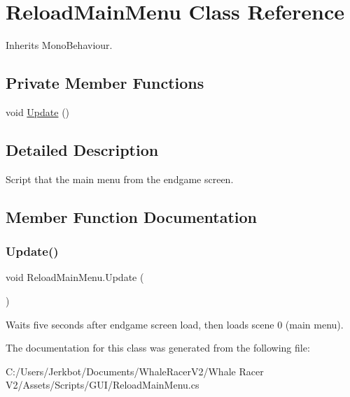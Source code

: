\hypertarget{class_reload_main_menu}{}\section{Reload\+Main\+Menu Class Reference}
\label{class_reload_main_menu}


Inherits Mono\+Behaviour.

\subsection*{Private Member Functions}
\begin{DoxyCompactItemize}
\item 
void \hyperlink{class_reload_main_menu_a57cffc9071822e96d43d4b48270a8583}{Update} ()
\end{DoxyCompactItemize}


\subsection{Detailed Description}
Script that the main menu from the endgame screen. 



\subsection{Member Function Documentation}
\mbox{\label{class_reload_main_menu_a57cffc9071822e96d43d4b48270a8583}} 
\subsubsection{\texorpdfstring{Update()}{Update()}}
{\footnotesize\ttfamily void Reload\+Main\+Menu.\+Update (\begin{DoxyParamCaption}{ }\end{DoxyParamCaption})\hspace{0.3cm}{\ttfamily [private]}}



Waits five seconds after endgame screen load, then loads scene 0 (main menu). 



The documentation for this class was generated from the following file\+:\begin{DoxyCompactItemize}
\item 
C\+:/\+Users/\+Jerkbot/\+Documents/\+Whale\+Racer\+V2/\+Whale Racer V2/\+Assets/\+Scripts/\+G\+U\+I/Reload\+Main\+Menu.\+cs\end{DoxyCompactItemize}
